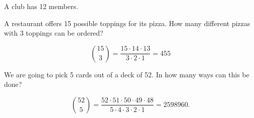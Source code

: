 \documentclass[11pt]{exam}
\begin{document}
\begin{questions}
\question A club has 12 members.  




\question A restaurant offers 15 possible toppings for its pizza.  How many
different pizzas with 3 toppings can be ordered?

\begin{solution}
\[
  \binom{15}{3} = \frac{15 \cdot 14 \cdot 13}{3 \cdot 2 \cdot 1} = 455
\]
\end{solution}



\question We are going to pick 5 cards out of a deck of 52.  In how many ways
can this be done?

\begin{solution}
\[
  \binom{52}{5}
  = \frac{52 \cdot 51 \cdot 50 \cdot 49 \cdot 48}{5 \cdot 4 \cdot 3 \cdot 2 \cdot 1}
  = 2598960.
\]
\end{solution}



\newpage



\end{questions}
\end{document}
